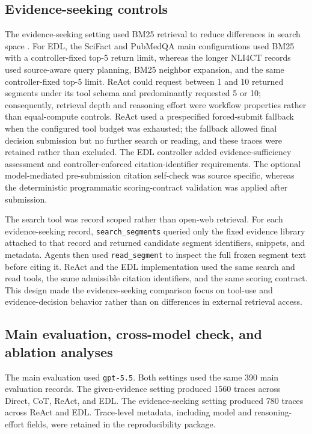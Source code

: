 \documentclass[11pt,a4paper]{article}
\begin{document}
\subsection{Evidence-seeking controls}

The evidence-seeking setting used BM25 retrieval to reduce differences in search space \cite{robertson1995okapi,robertson2009bm25}. For EDL, the SciFact and PubMedQA main configurations used BM25 with a controller-fixed top-5 return limit, whereas the longer NLI4CT records used source-aware query planning, BM25 neighbor expansion, and the same controller-fixed top-5 limit. ReAct could request between 1 and 10 returned segments under its tool schema and predominantly requested 5 or 10; consequently, retrieval depth and reasoning effort were workflow properties rather than equal-compute controls. ReAct used a prespecified forced-submit fallback when the configured tool budget was exhausted; the fallback allowed final decision submission but no further search or reading, and these traces were retained rather than excluded. The EDL controller added evidence-sufficiency assessment and controller-enforced citation-identifier requirements. The optional model-mediated pre-submission citation self-check was source specific, whereas the deterministic programmatic scoring-contract validation was applied after submission.

The search tool was record scoped rather than open-web retrieval. For each evidence-seeking record, \texttt{search\_segments} queried only the fixed evidence library attached to that record and returned candidate segment identifiers, snippets, and metadata. Agents then used \texttt{read\_segment} to inspect the full frozen segment text before citing it. ReAct and the EDL implementation used the same search and read tools, the same admissible citation identifiers, and the same scoring contract. This design made the evidence-seeking comparison focus on tool-use and evidence-decision behavior rather than on differences in external retrieval access.

\subsection{Main evaluation, cross-model check, and ablation analyses}

The main evaluation used \texttt{gpt-5.5}. Both settings used the same 390 main evaluation records. The given-evidence setting produced 1560 traces across Direct, CoT, ReAct, and EDL. The evidence-seeking setting produced 780 traces across ReAct and EDL. Trace-level metadata, including model and reasoning-effort fields, were retained in the reproducibility package.
\end{document}
